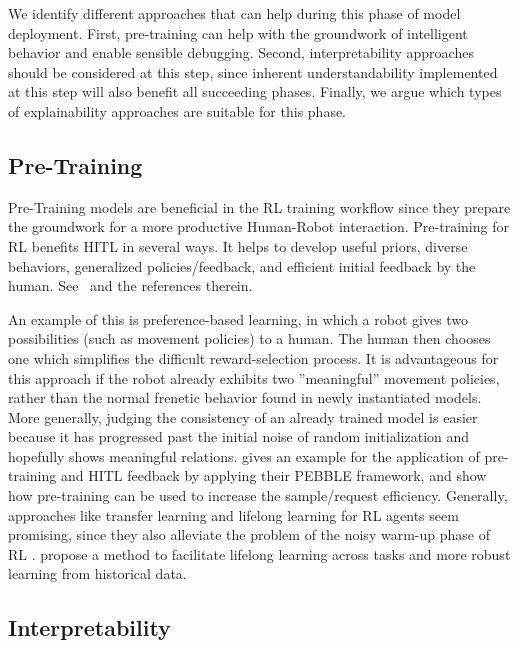 \documentclass[twoside,11pt]{article}
\begin{document}
We identify different approaches that can help during this phase of model deployment. First, pre-training can help with the groundwork of intelligent behavior and enable sensible debugging. Second, interpretability approaches should be considered at this step, since inherent understandability implemented at this step will also benefit all succeeding phases. Finally, we argue which types of explainability approaches are suitable for this phase.

\subsection{Pre-Training}
Pre-Training models are beneficial in the RL training workflow since they prepare the groundwork for a more productive Human-Robot interaction. Pre-training for RL benefits HITL in several ways. It helps to 
develop useful priors, diverse behaviors, generalized policies/feedback, and efficient initial feedback by the human. See~\citet{daniel2016hierarchical,eysenbach2018diversity,florensa2017stochastic,hazan2019provably,LeeSmithAbbeel:2021:FeedbackPreferenceHITLLearningPEBBLE} and the references therein.

An example of this is preference-based learning, in which a robot gives two possibilities (such as movement policies) to a human. The human then chooses one which simplifies the difficult reward-selection process. It is advantageous for this approach if the robot already exhibits two ''meaningful'' movement policies, rather than the normal frenetic behavior found in newly instantiated models.
More generally, judging the consistency of an already trained model is easier because it has progressed past the initial noise of random initialization and hopefully shows meaningful relations. \citet{LeeSmithAbbeel:2021:FeedbackPreferenceHITLLearningPEBBLE} gives an example for the application of pre-training and HITL feedback by applying their PEBBLE framework, and show how pre-training can be used to increase the sample/request efficiency.
Generally, approaches like transfer learning and lifelong learning for RL agents seem promising, since they also alleviate the problem of the noisy warm-up phase of RL \citep{taylor2009transfer,yang2021efficient}. \citet{AzarLazaricBrunskill:2013:LifelongLearning} propose a method to facilitate lifelong learning across tasks and more robust learning from historical data.

\subsection{Interpretability}
\label{subsec:interpretability}
\end{document}
